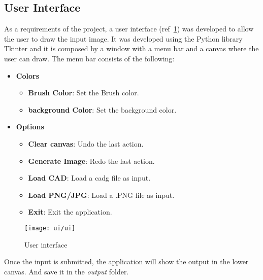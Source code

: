 \subsection{User Interface}\label{subsec:user-interface}
As a requirements of the project, a user interface (ref~\ref{fig:ui}) was developed to allow the user to draw the input image.
It was developed using the Python library Tkinter and it is composed by a window with a menu bar and a canvas where the user can draw.
The menu bar consists of the following:
\begin{itemize}
    \item \textbf{Colors}
    \begin{itemize}
        \item \textbf{Brush Color}: Set the Brush color.
        \item \textbf{background Color}: Set the background color.
    \end{itemize}
    \item \textbf{Options}
    \begin{itemize}
        \item \textbf{Clear canvas}: Undo the last action.
        \item \textbf{Generate Image}: Redo the last action.
        \item \textbf{Load CAD}: Load a \gls{cadg} file as input.
        \item \textbf{Load PNG/JPG}: Load a .PNG file as input.
        \item \textbf{Exit}: Exit the application.
    \end{itemize}
\end{itemize}
\begin{figure}[H]
    \centering
    \texttt{[image: ui/ui]}
    \caption{User interface}\label{fig:ui}
\end{figure}
Once the input is submitted, the application will show the output in the lower canvas.
And save it in the \textit{output} folder.
